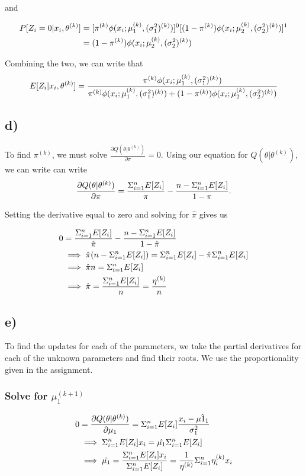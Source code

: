 \documentclass[]{article}
\begin{document}
and

\begin{align*}
P[Z_i = 0 | x_i, \theta^{(k)}] &= [\pi^{(k)}\phi(x_i; \mu_{1}^{(k)}, (\sigma_{1}^2)^{(k)})]^0 [(1- \pi^{(k)})\phi(x_i; \mu_{2}^{(k)}, (\sigma_{2}^2)^{(k)})]^{1} \\ &=
(1- \pi^{(k)})\phi(x_i; \mu_{2}^{(k)}, (\sigma_{2}^2)^{(k)})
\end{align*}

Combining the two, we can write that \[
E[Z_i | x_i, \theta^{(k)}] = \frac{\pi^{(k)}\phi(x_i; \mu_{1}^{(k)}, (\sigma_{1}^2)^{(k)})}{\pi^{(k)}\phi(x_i; \mu_{1}^{(k)}, (\sigma_{1}^2)^{(k)}) + (1- \pi^{(k)})\phi(x_i; \mu_{2}^{(k)}, (\sigma_{2}^2)^{(k)})}
\]

\subsection{d)}\label{d}

To find \(\pi^{(k)}\), we must solve
\(\frac{\partial Q(\theta | \theta^{(k)})}{\partial \pi} = 0\). Using
our equation for \(Q(\theta | \theta^{(k)})\), we can write can write \[
\frac{\partial Q(\theta | \theta^{(k)})}{\partial \pi} = \frac{\Sigma_{i=1}^{n} E[Z_i]}{\pi} - \frac{n - \Sigma_{i=1}^{n} E[Z_i]}{1-\pi}.
\]

Setting the derivative equal to zero and solving for \(\hat{\pi}\) gives
us

\begin{align*}
0 &= \frac{\Sigma_{i=1}^{n} E[Z_i]}{\hat{\pi}} - \frac{n - \Sigma_{i=1}^{n} E[Z_i]}{1-\hat{\pi}} \\
&\implies \hat{\pi}(n - \Sigma_{i=1}^{n} E[Z_i]) = \Sigma_{i=1}^{n} E[Z_i] - \hat{\pi} \Sigma_{i=1}^{n} E[Z_i] \\
&\implies \hat{\pi} n = \Sigma_{i=1}^{n} E[Z_i] \\
&\implies \hat{\pi} = \frac{\Sigma_{i=1}^{n} E[Z_i]}{n} = \frac{\eta^{(k)}}{n}
\end{align*}

\subsection{e)}\label{e-1}

To find the updates for each of the parameters, we take the partial
derivatives for each of the unknown parameters and find their roots. We
use the proportionality given in the assignment.

\subsubsection{\texorpdfstring{Solve for
\(\mu_1^{(k + 1)}\)}{Solve for \textbackslash{}mu\_1\^{}\{(k + 1)\}}}\label{solve-for-mu_1k-1}

\begin{align*}
0 &= \frac{\partial Q(\theta | \theta^{(k)})}{\partial \mu_1} = \Sigma_{i=1}^{n} E[Z_i] \frac{x_i - \hat{\mu1_1}}{\sigma_1^2} \\
&\implies \Sigma_{i=1}^{n} E[Z_i]x_i = \hat{\mu_1} \Sigma_{i=1}^{n} E[Z_i] \\
&\implies \hat{\mu_1} = \frac{\Sigma_{i=1}^{n} E[Z_i] x_i}{\Sigma_{i=1}^{n} E[Z_i]} = \frac{1}{\eta^{(k)}}\Sigma_{i=1}^{n} \eta^{(k)}_i x_i
\end{align*}
\end{document}
